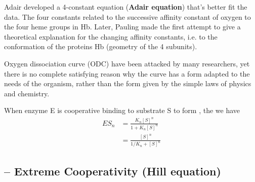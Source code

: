 Adair \citep{adair1925odc} developed a 4-constant equation
({\bf Adair equation}) that's better fit the data. The four constants
related to the successive affinity constant of oxygen to the four heme
groups in Hb. Later, Pauling made the first attempt to give a
theoretical explanation for the changing affinity constants, i.e. to
the conformation of the proteins Hb (geometry of the 4 subunits).

Oxygen dissociation curve (ODC) have been attacked by many
researchers, yet there is no complete satisfying reason why the curve
has a form adapted to the needs of the organism, rather than the form
given by the simple laws of physics and chemistry.


When enzyme E is cooperative binding to substrate S to form ,
the we have
\begin{equation}
  \label{eq:341}
  \begin{split}
    ES_n &= \frac{K_n[S]^n}{1+K_n[S]^n} \\
    &= \frac{[S]^n}{1/K_n+[S]^n} 
  \end{split}
\end{equation}

\subsection{-- Extreme Cooperativity (Hill equation)}

